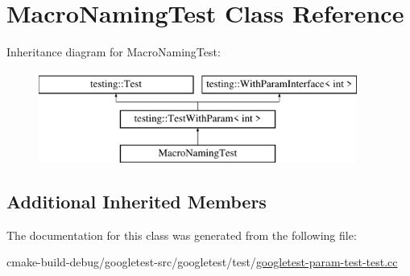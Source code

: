 \hypertarget{classMacroNamingTest}{}\section{Macro\+Naming\+Test Class Reference}
\label{classMacroNamingTest}
Inheritance diagram for Macro\+Naming\+Test\+:\begin{figure}[H]
\begin{center}
\leavevmode
\includegraphics[height=3.000000cm]{classMacroNamingTest}
\end{center}
\end{figure}
\subsection*{Additional Inherited Members}


The documentation for this class was generated from the following file\+:\begin{DoxyCompactItemize}
\item 
cmake-\/build-\/debug/googletest-\/src/googletest/test/\mbox{\hyperlink{googletest-param-test-test_8cc}{googletest-\/param-\/test-\/test.\+cc}}\end{DoxyCompactItemize}
